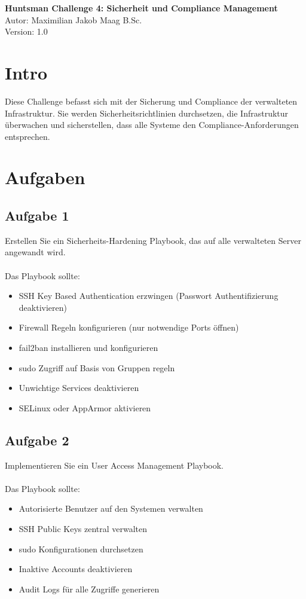 \documentclass{article}
\begin{document}
    \begin{center}
        \Large \textbf{Huntsman Challenge 4: Sicherheit und Compliance Management} \\ [6pt]
        \normalsize
        Autor: Maximilian Jakob Maag B.Sc. \\
        Version: 1.0
    \end{center}

    \section{Intro}
    Diese Challenge befasst sich mit der Sicherung und Compliance der verwalteten Infrastruktur.
    Sie werden Sicherheitsrichtlinien durchsetzen, die Infrastruktur überwachen und sicherstellen, dass alle Systeme den Compliance-Anforderungen entsprechen.

    \section{Aufgaben}

    \subsection{Aufgabe 1}
    Erstellen Sie ein Sicherheits-Hardening Playbook, das auf alle verwalteten Server angewandt wird.
    \\ \\
    Das Playbook sollte:
    \begin{itemize}
        \item SSH Key Based Authentication erzwingen (Passwort Authentifizierung deaktivieren)
        \item Firewall Regeln konfigurieren (nur notwendige Ports öffnen)
        \item fail2ban installieren und konfigurieren
        \item sudo Zugriff auf Basis von Gruppen regeln
        \item Unwichtige Services deaktivieren
        \item SELinux oder AppArmor aktivieren
    \end{itemize}

    \subsection{Aufgabe 2}
    Implementieren Sie ein User Access Management Playbook.
    \\ \\
    Das Playbook sollte:
    \begin{itemize}
        \item Autorisierte Benutzer auf den Systemen verwalten
        \item SSH Public Keys zentral verwalten
        \item sudo Konfigurationen durchsetzen
        \item Inaktive Accounts deaktivieren
        \item Audit Logs für alle Zugriffe generieren
    \end{itemize}
\end{document}
